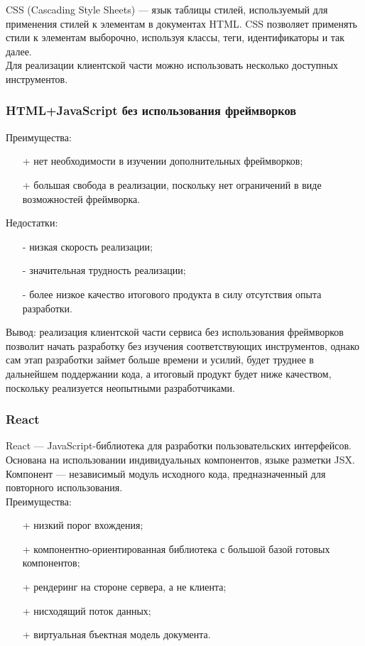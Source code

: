 \documentclass[a4paper,12pt]{article}
\begin{document}
CSS (Cascading Style Sheets) — язык таблицы стилей, используемый для применения стилей к элементам в документах HTML. CSS позволяет применять стили к элементам выборочно, используя классы, теги, идентификаторы и так далее. \cite{website:css}\\

Для реализации клиентской части можно использовать несколько доступных инструментов.
\subsubsection{HTML+JavaScript без использования фреймворков}
Преимущества:
\begin{itemize}
	\item[+] нет необходимости в изучении дополнительных фреймворков;
	\item[+] большая свобода в реализации, поскольку нет ограничений в виде возможностей фреймворка.
\end{itemize}

Недостатки:
\begin{itemize}
	\item[-] низкая скорость реализации;
	\item[-] значительная трудность реализации;
	\item[-] более низкое качество итогового продукта в силу отсутствия опыта разработки.
\end{itemize}

Вывод: реализация клиентской части сервиса без использования фреймворков позволит начать разработку без изучения соответствующих инструментов, однако сам этап разработки займет больше времени и усилий, будет труднее в дальнейшем поддержании кода, а итоговый продукт будет ниже качеством, поскольку реализуется неопытными разработчиками.\\



\subsubsection{React}
React — JavaScript-библиотека для разработки пользовательских интерфейсов. Основана на использовании индивидуальных компонентов, языке разметки JSX. Компонент — независимый модуль исходного кода, предназначенный для повторного использования. \cite{website:react} \cite{website:medium}\\
Преимущества:
\begin{itemize}
	\item[+] низкий порог вхождения;
	\item[+] компонентно-ориентированная библиотека с большой базой готовых компонентов;
	\item[+] рендеринг на стороне сервера, а не клиента;
	\item[+] нисходящий поток данных;
	\item[+] виртуальная бъектная модель документа.
\end{itemize}
\end{document}
